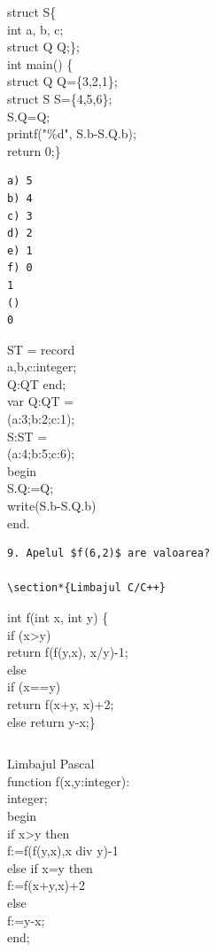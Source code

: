 \documentclass[10pt]{article}
\begin{document}
\begin{verbatim}

\end{verbatim}

struct S\{\\
int a, b, c;\\
struct Q Q;\};\\
int main() \{\\
struct Q Q=\{3,2,1\};\\
struct S S=\{4,5,6\};\\
S.Q=Q;\\
printf("\%d", S.b-S.Q.b);\\
return 0;\}

\begin{verbatim}
a) 5
b) 4
c) 3
d) 2
e) 1
f) 0
1
()
0
\end{verbatim}

ST = record\\
a,b,c:integer;\\
Q:QT end;\\
var Q:QT =\\
(a:3;b:2;c:1);\\
S:ST =\\
(a:4;b:5;c:6);\\
begin\\
S.Q:=Q;\\
write(S.b-S.Q.b)\\
end.

\begin{verbatim}
9. Apelul $f(6,2)$ are valoarea?

\section*{Limbajul C/C++}
\end{verbatim}

int f(int x, int y) \{\\
if (x>y)\\
return f(f(y,x), x/y)-1;\\
else\\
if (x==y)\\
return f(x+y, x)+2;\\
else return y-x;\}

\begin{verbatim}

\end{verbatim}

Limbajul Pascal\\
function f(x,y:integer):\\
integer;\\
begin\\
if x>y then\\
f:=f(f(y,x),x div y)-1\\
else if x=y then\\
f:=f(x+y,x)+2\\
else\\
f:=y-x;\\
end;
\end{document}

